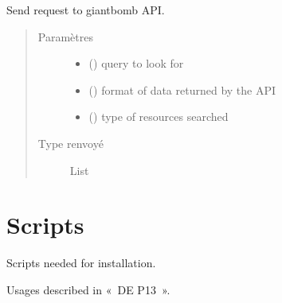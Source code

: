\documentclass[letterpaper,10pt,french]{sphinxmanual}
\begin{document}

\begin{fulllineitems}
\label{\detokenize{scrapping:scrapping.send_requests.send_request}}
Send request to giantbomb API.
\begin{quote}\begin{description}
\item[{Paramètres}] \leavevmode\begin{itemize}
\item {}
 () \textendash{} query to look for

\item {}
 () \textendash{} format of data returned by the API

\item {}
 (\sphinxstyleliteralemphasis{\sphinxupquote{{[}}}\sphinxstyleliteralemphasis{\sphinxupquote{{]}}}) \textendash{} type of resources searched

\end{itemize}

\item[{Type renvoyé}] \leavevmode
List

\end{description}\end{quote}

\end{fulllineitems}



\chapter{Scripts}
\label{\detokenize{scripts:scripts}}\label{\detokenize{scripts::doc}}
Scripts needed for installation.

Usages described in « DE \sphinxhyphen{} P13 ».
\end{document}
